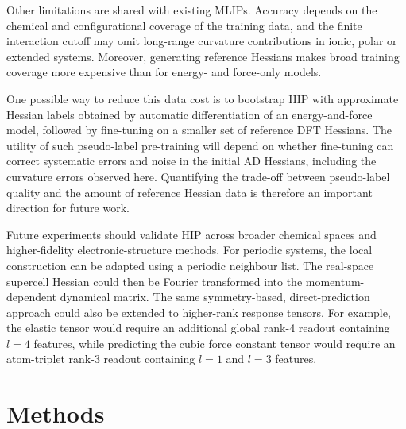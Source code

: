 \documentclass[pdflatex,sn-mathphys-num]{sn-jnl}%
\begin{document}
Other limitations are shared with existing MLIPs. Accuracy depends on the chemical and configurational coverage of the training data, and the finite interaction cutoff may omit long-range curvature contributions in ionic, polar or extended systems. Moreover, generating reference Hessians makes broad training coverage more expensive than for energy- and force-only models.

One possible way to reduce this data cost is to bootstrap HIP with approximate Hessian labels obtained by automatic differentiation of an energy-and-force model, followed by fine-tuning on a smaller set of reference DFT Hessians. The utility of such pseudo-label pre-training will depend on whether fine-tuning can correct systematic errors and noise in the initial AD Hessians, including the curvature errors observed here. Quantifying the trade-off between pseudo-label quality and the amount of reference Hessian data is therefore an important direction for future work.

Future experiments should validate HIP across broader chemical spaces and higher-fidelity electronic-structure methods. For periodic systems, the local construction can be adapted using a periodic neighbour list. The real-space supercell Hessian could then be Fourier transformed into the 
momentum-dependent dynamical matrix. The same symmetry-based, direct-prediction approach could also be extended to higher-rank response tensors. For example, the elastic tensor would require an additional global rank-4 readout containing $l=4$ features, while predicting the cubic force constant tensor would require an atom-triplet rank-3 readout containing $l=1$ and $l=3$ features.

\section{Methods}
\end{document}
